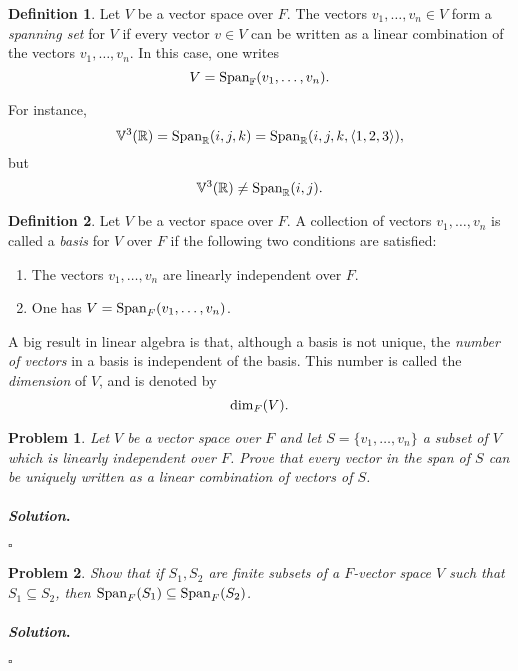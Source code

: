 \documentclass[reqno]{amsart}
\theoremstyle{plain}
\newtheorem{problem}{Problem}
\theoremstyle{definition}
\newtheorem{definition}{Definition}
\newenvironment{solution}{\paragraph{\emph{Solution}.}}{\hfill$\square$}
\begin{document}
\begin{definition}
Let $V$ be a vector space over $F$.  The vectors $v_{1},\ldots,v_{n} \in V$ form a \emph{spanning set} for $V$ if every vector $v \in V$ can be written as a linear combination of the vectors $v_{1},\ldots,v_{n}$.  In this case, one writes
$$V = {\rm Span}_{\mathbb{F}}(v_{1},\ldots,v_{n}). $$
\end{definition}

For instance, 
$$\mathbb{V}^{3}(\mathbb{R}) = {\rm Span}_{\mathbb{R}}(i,j,k) = {\rm Span}_{\mathbb{R}}(i,j,k,\langle 1,2,3 \rangle),$$
but
$$\mathbb{V}^{3}(\mathbb{R}) \neq {\rm Span}_{\mathbb{R}}(i,j). $$

\begin{definition}
Let $V$ be a vector space over $F$.  A collection of vectors $v_{1},\ldots,v_{n}$ is called a \emph{basis} for $V$ over $F$ if the following two conditions are satisfied:
\begin{enumerate}
\item The vectors $v_{1},\ldots,v_{n}$ are linearly independent over $F$.
\item One has $V = {\rm Span}_{F}(v_{1},\ldots,v_{n})$.
\end{enumerate}
A big result in linear algebra is that, although a basis is not unique, the \emph{number of vectors} in a basis is independent of the basis.  This number is called the \emph{dimension} of $V$, and is denoted by
$${\rm dim}_{F}(V). $$
\end{definition}

\begin{problem}
Let $V$ be a vector space over $F$ and let $S = \{v_{1},\ldots,v_{n} \}$ a subset of $V$ which is linearly independent over $F$.  Prove that every vector in the span of $S$ can be \emph{uniquely} written as a linear combination of vectors of $S$.
\end{problem}
\begin{solution}

\end{solution}

\begin{problem}
Show that if $S_{1}, S_{2}$ are finite subsets of a $F$-vector space $V$ such that $S_{1} \subseteq S_{2}$, then ${\rm Span}_{F}(S_{1}) \subseteq {\rm Span}_{F}(S_{2})$.
\end{problem}
\begin{solution}

\end{solution}
\end{document}
